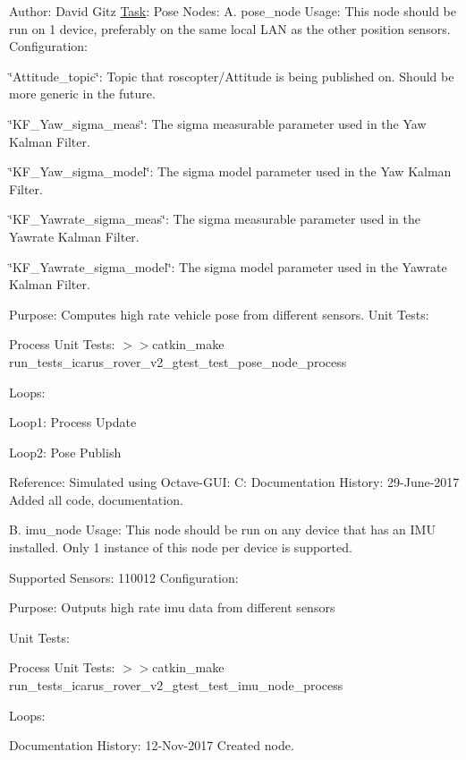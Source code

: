 Author\+: David Gitz \hyperlink{structTask}{Task}\+: Pose Nodes\+: A. pose\+\_\+node Usage\+: This node should be run on 1 device, preferably on the same local L\+AN as the other position sensors. Configuration\+:
\begin{DoxyItemize}
\item \char`\"{}\+Attitude\+\_\+topic\char`\"{}\+: Topic that roscopter/\+Attitude is being published on. Should be more generic in the future.
\item \char`\"{}\+K\+F\+\_\+\+Yaw\+\_\+sigma\+\_\+meas\char`\"{}\+: The sigma measurable parameter used in the Yaw Kalman Filter.
\item \char`\"{}\+K\+F\+\_\+\+Yaw\+\_\+sigma\+\_\+model\char`\"{}\+: The sigma model parameter used in the Yaw Kalman Filter.
\item \char`\"{}\+K\+F\+\_\+\+Yawrate\+\_\+sigma\+\_\+meas\char`\"{}\+: The sigma measurable parameter used in the Yawrate Kalman Filter.
\item \char`\"{}\+K\+F\+\_\+\+Yawrate\+\_\+sigma\+\_\+model\char`\"{}\+: The sigma model parameter used in the Yawrate Kalman Filter.
\end{DoxyItemize}

Purpose\+: Computes high rate vehicle pose from different sensors. Unit Tests\+:
\begin{DoxyEnumerate}
\item Process Unit Tests\+: $>$$>$catkin\+\_\+make run\+\_\+tests\+\_\+icarus\+\_\+rover\+\_\+v2\+\_\+gtest\+\_\+test\+\_\+pose\+\_\+node\+\_\+process
\end{DoxyEnumerate}

Loops\+:
\begin{DoxyItemize}
\item Loop1\+: Process Update
\item Loop2\+: Pose Publish
\end{DoxyItemize}

Reference\+: Simulated using Octave-\/\+G\+UI\+: C\+: Documentation History\+: 29-\/\+June-\/2017 Added all code, documentation.

B. imu\+\_\+node Usage\+: This node should be run on any device that has an I\+MU installed. Only 1 instance of this node per device is supported.

Supported Sensors\+: 110012 Configuration\+:

Purpose\+: Outputs high rate imu data from different sensors

Unit Tests\+:
\begin{DoxyEnumerate}
\item Process Unit Tests\+: $>$$>$catkin\+\_\+make run\+\_\+tests\+\_\+icarus\+\_\+rover\+\_\+v2\+\_\+gtest\+\_\+test\+\_\+imu\+\_\+node\+\_\+process
\end{DoxyEnumerate}

Loops\+:

Documentation History\+: 12-\/\+Nov-\/2017 Created node. 
